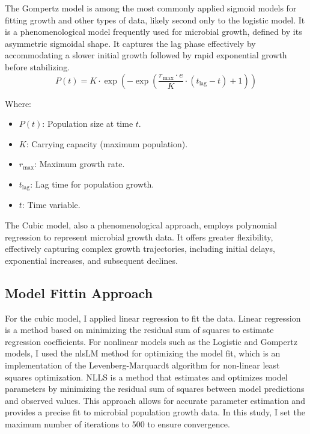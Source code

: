 \documentclass{article}
\begin{document}
The Gompertz model is among the most commonly applied sigmoid models for fitting growth and other types of data, likely second only to the logistic model.\cite{2017Gompertz} It is a phenomenological model frequently used for microbial growth, defined by its asymmetric sigmoidal shape. It captures the lag phase effectively by accommodating a slower initial growth followed by rapid exponential growth before stabilizing. 
\begin{equation}
    P(t) = K \cdot \exp\left(-\exp\left(\frac{r_{\text{max}} \cdot e}{K} \cdot (t_{\text{lag}} - t) + 1\right)\right)
\end{equation}

Where:
\begin{itemize}
    \item \( P(t) \): Population size at time \( t \).
    \item \( K \): Carrying capacity (maximum population).
    \item \( r_{\text{max}} \): Maximum growth rate.
    \item \( t_{\text{lag}} \): Lag time for population growth.
    \item \( t \): Time variable.
\end{itemize}

The Cubic model, also a phenomenological approach, employs polynomial regression to represent microbial growth data. It offers greater flexibility, effectively capturing complex growth trajectories, including initial delays, exponential increases, and subsequent declines.

\subsection{Model Fittin Approach}
For the cubic model, I applied linear regression to fit the data. Linear regression is a method based on minimizing the residual sum of squares to estimate regression coefficients.
For nonlinear models such as the Logistic and Gompertz models, I used the nlsLM method for optimizing the model fit, which is an implementation of the Levenberg-Marquardt algorithm for non-linear least squares optimization. NLLS is a method that estimates and optimizes model parameters by minimizing the residual sum of squares between model predictions and observed values. This approach allows for accurate parameter estimation and provides a precise fit to microbial population growth data. In this study, I set the maximum number of iterations to 500 to ensure convergence.
\end{document}
